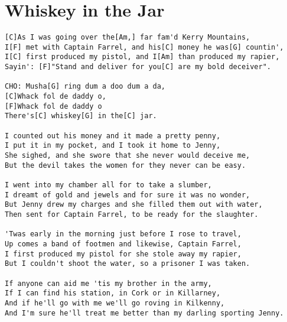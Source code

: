 \documentclass[leqno]{memoir}
\begin{document}
\chapter{Whiskey in the Jar}
\begin{verbatim}
[C]As I was going over the[Am,] far fam'd Kerry Mountains,
I[F] met with Captain Farrel, and his[C] money he was[G] countin',
I[C] first produced my pistol, and I[Am] than produced my rapier,
Sayin': [F]"Stand and deliver for you[C] are my bold deceiver". 

CHO: Musha[G] ring dum a doo dum a da,
[C]Whack fol de daddy o,
[F]Whack fol de daddy o
There's[C] whiskey[G] in the[C] jar. 

I counted out his money and it made a pretty penny,
I put it in my pocket, and I took it home to Jenny,
She sighed, and she swore that she never would deceive me,
But the devil takes the women for they never can be easy.

I went into my chamber all for to take a slumber,
I dreamt of gold and jewels and for sure it was no wonder,
But Jenny drew my charges and she filled them out with water,
Then sent for Captain Farrel, to be ready for the slaughter.

'Twas early in the morning just before I rose to travel,
Up comes a band of footmen and likewise, Captain Farrel,
I first produced my pistol for she stole away my rapier,
But I couldn't shoot the water, so a prisoner I was taken.

If anyone can aid me 'tis my brother in the army,
If I can find his station, in Cork or in Killarney,
And if he'll go with me we'll go roving in Kilkenny,
And I'm sure he'll treat me better than my darling sporting Jenny. 
\end{verbatim}
\newpage
\end{document}
